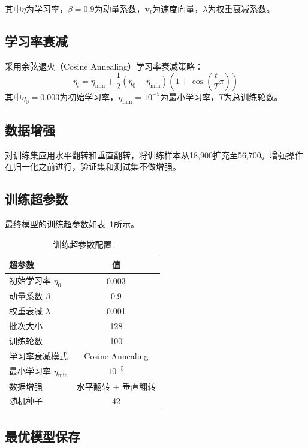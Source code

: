 \documentclass[12pt,a4paper]{article}
\begin{document}
其中$\eta$为学习率，$\beta=0.9$为动量系数，$\mathbf{v}_t$为速度向量，$\lambda$为权重衰减系数。

\subsection{学习率衰减}

采用余弦退火（Cosine Annealing）学习率衰减策略：
\begin{equation}
    \eta_t = \eta_{\min} + \frac{1}{2}(\eta_0 - \eta_{\min})\left(1 + \cos\left(\frac{t}{T}\pi\right)\right)
\end{equation}
其中$\eta_0 = 0.003$为初始学习率，$\eta_{\min} = 10^{-5}$为最小学习率，$T$为总训练轮数。

\subsection{数据增强}

对训练集应用水平翻转和垂直翻转，将训练样本从18,900扩充至56,700。增强操作在归一化之前进行，验证集和测试集不做增强。

\subsection{训练超参数}

最终模型的训练超参数如表~\ref{tab:train_config}所示。

\begin{table}[H]
\centering
\caption{训练超参数配置}
\label{tab:train_config}
\begin{tabular}{lc}
\toprule
\textbf{超参数} & \textbf{值} \\
\midrule
初始学习率 $\eta_0$ & 0.003 \\
动量系数 $\beta$ & 0.9 \\
权重衰减 $\lambda$ & 0.001 \\
批次大小 & 128 \\
训练轮数 & 100 \\
学习率衰减模式 & Cosine Annealing \\
最小学习率 $\eta_{\min}$ & $10^{-5}$ \\
数据增强 & 水平翻转 + 垂直翻转 \\
随机种子 & 42 \\
\bottomrule
\end{tabular}
\end{table}

\subsection{最优模型保存}
\end{document}
